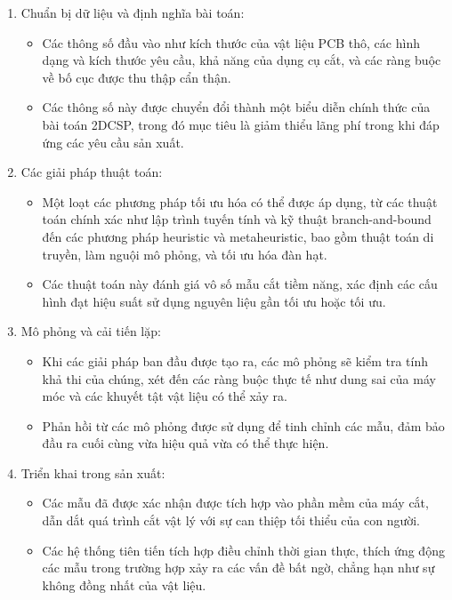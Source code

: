 \begin{enumerate}[1.]
    \item Chuẩn bị dữ liệu và định nghĩa bài toán:
    \begin{itemize}
        \item Các thông số đầu vào như kích thước của vật liệu PCB thô, các hình dạng và kích thước yêu cầu, khả năng của dụng cụ cắt, và các ràng buộc về bố cục được thu thập cẩn thận.
        \item Các thông số này được chuyển đổi thành một biểu diễn chính thức của bài toán 2DCSP, trong đó mục tiêu là giảm thiểu lãng phí trong khi đáp ứng các yêu cầu sản xuất.
    \end{itemize}
    

    \item Các giải pháp thuật toán:
    \begin{itemize}
        \item Một loạt các phương pháp tối ưu hóa có thể được áp dụng, từ các thuật toán chính xác như lập trình tuyến tính và kỹ thuật branch-and-bound đến các phương pháp heuristic và metaheuristic, bao gồm thuật toán di truyền, làm nguội mô phỏng, và tối ưu hóa đàn hạt.
        \item Các thuật toán này đánh giá vô số mẫu cắt tiềm năng, xác định các cấu hình đạt hiệu suất sử dụng nguyên liệu gần tối ưu hoặc tối ưu.
    \end{itemize}


    \item Mô phỏng và cải tiến lặp:
     \begin{itemize}
        \item Khi các giải pháp ban đầu được tạo ra, các mô phỏng sẽ kiểm tra tính khả thi của chúng, xét đến các ràng buộc thực tế như dung sai của máy móc và các khuyết tật vật liệu có thể xảy ra.
        \item Phản hồi từ các mô phỏng được sử dụng để tinh chỉnh các mẫu, đảm bảo đầu ra cuối cùng vừa hiệu quả vừa có thể thực hiện.
    \end{itemize}

    \item Triển khai trong sản xuất:
     \begin{itemize}
        \item Các mẫu đã được xác nhận được tích hợp vào phần mềm của máy cắt, dẫn dắt quá trình cắt vật lý với sự can thiệp tối thiểu của con người.
        \item Các hệ thống tiên tiến tích hợp điều chỉnh thời gian thực, thích ứng động các mẫu trong trường hợp xảy ra các vấn đề bất ngờ, chẳng hạn như sự không đồng nhất của vật liệu.
    \end{itemize}
\end{enumerate}

